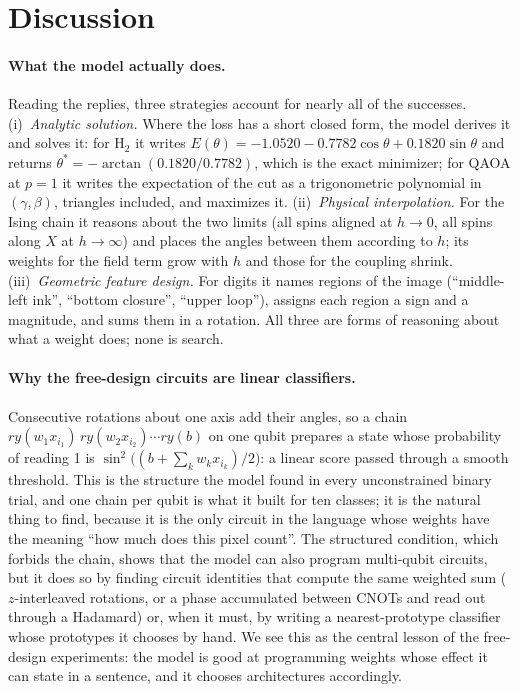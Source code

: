 \section{Discussion}
\label{sec:discussion}

\paragraph{What the model actually does.}
Reading the replies, three strategies account for nearly all of the successes. (i)~\emph{Analytic solution.} Where the loss has a short closed form, the model derives it and solves it: for H$_2$ it writes $E(\theta) = -1.0520 - 0.7782\cos\theta + 0.1820\sin\theta$ and returns $\theta^\ast = -\arctan(0.1820/0.7782)$, which is the exact minimizer; for QAOA at $p = 1$ it writes the expectation of the cut as a trigonometric polynomial in $(\gamma, \beta)$, triangles included, and maximizes it. (ii)~\emph{Physical interpolation.} For the Ising chain it reasons about the two limits (all spins aligned at $h \to 0$, all spins along $X$ at $h \to \infty$) and places the angles between them according to $h$; its weights for the field term grow with $h$ and those for the coupling shrink. (iii)~\emph{Geometric feature design.} For digits it names regions of the image (``middle-left ink'', ``bottom closure'', ``upper loop''), assigns each region a sign and a magnitude, and sums them in a rotation. All three are forms of reasoning about what a weight does; none is search.

\paragraph{Why the free-design circuits are linear classifiers.}
Consecutive rotations about one axis add their angles, so a chain $ry(w_1 x_{i_1})\,ry(w_2 x_{i_2}) \cdots ry(b)$ on one qubit prepares a state whose probability of reading 1 is $\sin^2\!\big((b + \sum_k w_k x_{i_k})/2\big)$: a linear score passed through a smooth threshold. This is the structure the model found in every unconstrained binary trial, and one chain per qubit is what it built for ten classes; it is the natural thing to find, because it is the only circuit in the language whose weights have the meaning ``how much does this pixel count''. The structured condition, which forbids the chain, shows that the model can also program multi-qubit circuits, but it does so by finding circuit identities that compute the same weighted sum ($z$-interleaved rotations, or a phase accumulated between CNOTs and read out through a Hadamard) or, when it must, by writing a nearest-prototype classifier whose prototypes it chooses by hand. We see this as the central lesson of the free-design experiments: the model is good at programming weights whose effect it can state in a sentence, and it chooses architectures accordingly.

